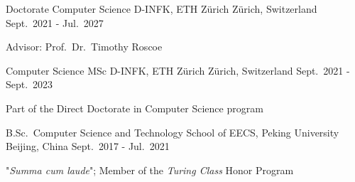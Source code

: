 

\begin{cventries}

  \cventry
    {Doctorate Computer Science} %
    {D-INFK, ETH Zürich} %
    {Zürich, Switzerland} %
    {Sept.\ 2021 - Jul.\ 2027} %
    {
      \begin{cvitems} %
      \item {Advisor: Prof.\ Dr.\ Timothy Roscoe}
      \end{cvitems}
    }

  \cventry
    {Computer Science MSc} %
    {D-INFK, ETH Zürich} %
    {Zürich, Switzerland} %
    {Sept.\ 2021 - Sept.\ 2023} %
    {
      \begin{cvitems} %
      \item {Part of the Direct Doctorate in Computer Science program}
      \end{cvitems}
    }

  \cventry
    {B.Sc.\ Computer Science and Technology} %
    {School of EECS, Peking University} %
    {Beijing, China} %
    {Sept.\ 2017 - Jul.\ 2021} %
    {
      \begin{cvitems} %
      \item {"\emph{Summa cum laude}"; Member of the \emph{Turing Class} Honor Program}
      \end{cvitems}
    }

\end{cventries}
